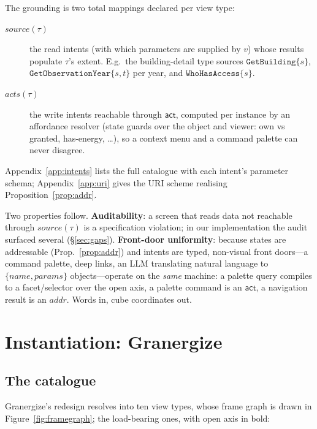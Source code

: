 \documentclass[11pt,a4paper]{article}
\theoremstyle{remark}
\newcommand{\vact}{\mathsf{act}}
\newcommand{\addr}{\mathit{addr}}
\newcommand{\src}{\mathit{source}}
\newcommand{\acts}{\mathit{acts}}
\begin{document}
The grounding is two total mappings declared per view type:

\begin{description}
\item[$\src(\tau)$] the read intents (with which parameters are supplied by $v$)
  whose results populate $\tau$'s extent. E.g.\ the building-detail type sources
  $\texttt{GetBuilding}\{s\}$, $\texttt{GetObservationYear}\{s, t\}$ per year, and
  $\texttt{WhoHasAccess}\{s\}$.
\item[$\acts(\tau)$] the write intents reachable through $\vact$, computed per
  instance by an affordance resolver (state guards over the object and viewer:
  own vs granted, has-energy, \ldots), so a context menu and a command palette can
  never disagree.
\end{description}

Appendix~\ref{app:intents} lists the full catalogue with each intent's parameter
schema; Appendix~\ref{app:uri} gives the URI scheme realising
Proposition~\ref{prop:addr}.

Two properties follow. \textbf{Auditability}: a screen that reads data not
reachable through $\src(\tau)$ is a specification violation; in our implementation
the audit surfaced several (\S\ref{sec:gaps}). \textbf{Front-door uniformity}:
because states are addressable (Prop.~\ref{prop:addr}) and intents are typed,
non-visual front doors---a command palette, deep links, an LLM translating natural
language to $\{name, params\}$ objects---operate on the \emph{same} machine: a
palette query compiles to a facet/selector over the open axis, a palette command is
an $\vact$, a navigation result is an $\addr$. Words in, cube coordinates out.

\section{Instantiation: Granergize}\label{sec:instantiation}

\subsection{The catalogue}

Granergize's redesign resolves into ten view types, whose frame graph is drawn
in Figure~\ref{fig:framegraph}; the load-bearing ones, with
open axis in bold:
\end{document}
